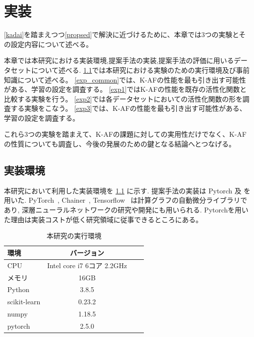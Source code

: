 \chapter{実装}
\label{implementation}

\ref{kadai}を踏まえつつ\ref{propsed}で解決に近づけるために、本章では3つの実験とその設定内容について述べる。

本章では本研究における実装環境,提案手法の実装,提案手法の評価に用いるデータセットについて述べる.
\ref{impl_env}では本研究における実験のための実行環境及び事前知識について述べる。
\ref{exp_common}では、K-AFの性能を最も引き出す可能性がある、学習の設定を調査する。
\ref{exp1}ではK-AFの性能を既存の活性化関数と比較する実験を行う。
\ref{exp2}では各データセットにおいての活性化関数の形を調査する実験をこなう。
\ref{exp3}では、K-AFの性能を最も引き出す可能性がある、学習の設定を調査する。

これら3つの実験を踏まえて、K-AFの課題に対しての実用性だけでなく、K-AFの性質についても調査し、今後の発展のための鍵となる結論へとつなげる。



\section{実装環境}
\label{impl_env}



本研究において利用した実装環境を \ref{impl_table} に示す. 提案手法の実装は Pytorch 及
を用いた.  PyTorch~\cite{pytorch}, Chainer~\cite{chainer},  Tensorflow~\cite{tensorflow} は計算グラフの自動微分ライブラリであり, 深層ニューラルネットワークの研究や開発にも用いられる.
Pytorchを用いた理由は実装コストが低く研究領域に従事できるところにある。


\begin{table}[htbp]
\label{impl_table}
    \begin{center}
        \caption{本研究の実行環境}
        \vspace{5mm} 
        \begin{tabular}{l*{2}{c}r}
        環境              & バージョン \\
        \hline
        CPU               & Intel core i7 6コア 2.2GHz \\
        メモリ             & 16GB \\
        Python            & 3.8.5  \\
        scikit-learn      & 0.23.2\\
        numpy             & 1.18.5 \\
        pytorch           & 2.5.0 \\
        \end{tabular}
    \end{center}
\end{table}



